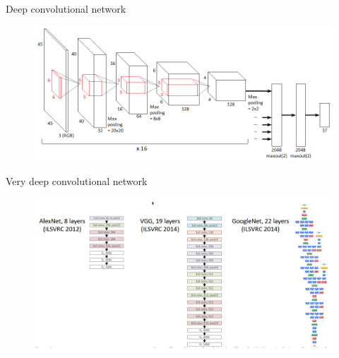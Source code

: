 \documentclass{beamer}
\begin{document}
\begin{frame}{Deep convolutional network}

\begin{figure}[h!]
  \centering
  \includegraphics[width=1\textwidth]{images/deep_conv.png}
\end{figure}

\end{frame}


\begin{frame}{Very deep convolutional network}

\begin{figure}[h!]
  \centering
  \includegraphics[width=1\textwidth]{images/comp1.png}
\end{figure}

\end{frame}
\end{document}

